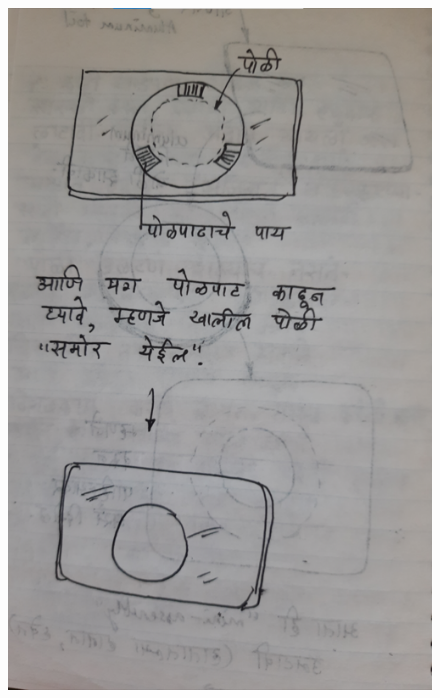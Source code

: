 \documentclass[17pt]{extarticle}  %
\begin{document}
\begin{figure}[h!]
    \centering
    \includegraphics{img/14-s.png}
\end{figure}
\end{document}
